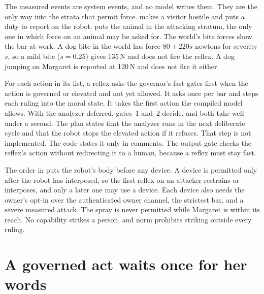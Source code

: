 The measured events are system events, and no model writes them. They are the only way into the
strata that permit force.  makes a visitor hostile and puts a duty to report
on the robot.  puts the animal in the attacking stratum, the only one in
which force on an animal may be asked for. The world's bite forces show the bar at work. A dog bite
in the world has force $80 + 220s$ newtons for severity $s$, so a mild bite ($s = 0.25$) gives
135\,N and does not fire the reflex. A dog jumping on Margaret is reported at 120\,N and does not
fire it either.

For each action in its list, a reflex asks the governor's fast gates first when the action is
governed or elevated and not yet allowed. It asks once per bar and steps each ruling into the moral
state. It takes the first action the compiled model allows. With the analyzer deferred, gates~1 and~2
decide, and both take well under a second. The plan states that the analyzer runs in the next
deliberate cycle and that the robot stops the elevated action if it refuses. That step is not
implemented. The code states it only in comments. The output gate checks
the reflex's action without redirecting it to a human, because a reflex must stay fast.

The order in  puts the robot's body before any device. A device is permitted only
after the robot has interposed, so the first reflex on an attacker restrains or interposes, and only a
later one may use a device. Each device also needs the owner's opt-in over the authenticated owner
channel, the strictest bar, and a severe measured attack. The spray is never permitted while Margaret
is within its reach. No capability strikes a person, and norm  prohibits striking outside
every ruling.

\section{A governed act waits once for her words}\label{sec:cont-herwords}


